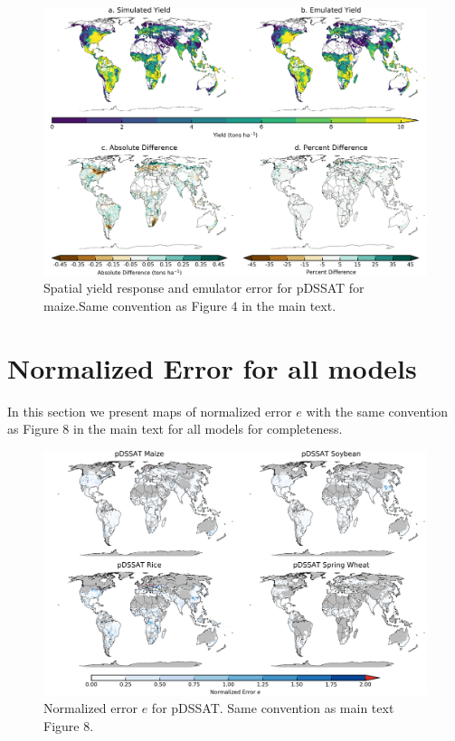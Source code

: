 \documentclass[12pt]{article}
\begin{document}
{{\begin{figure}[h!]
  \includegraphics[width=\textwidth]{pdssat_maize.png}
  \caption{Spatial yield response and emulator error for pDSSAT for maize.Same convention as Figure 4 in the main text.}
  \label{fig:lpjmlrice}
\end{figure}


\clearpage
\section{Normalized Error for all models}
\begin{flushleft}
In this section we present maps of normalized error $e$ with the same convention as Figure 8 in the main text for all models for completeness. 
\end{flushleft}

\begin{figure}[h!]
  \centering
  \includegraphics[width=15.5cm]{pDSSAT_spatial_error.png}
  \caption{Normalized error $e$ for pDSSAT. Same convention as main text Figure 8.}
\end{figure}

}}
\end{document}
